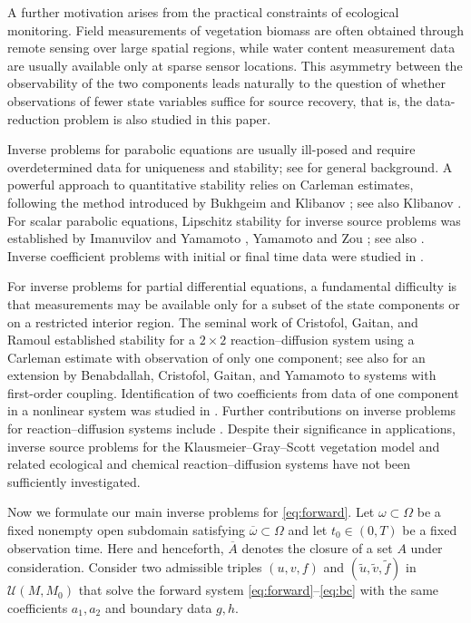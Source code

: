 \documentclass[12pt]{amsart}
\theoremstyle{plain}
\theoremstyle{definition}
\theoremstyle{remark}
\newcommand{\ooo}{\overline}
\newcommand{\Om}{\Omega}
\newcommand{\revi}[1]{{\color{blue}#1}}
\begin{document}
A further motivation arises from the practical constraints of ecological
monitoring.
Field measurements of vegetation biomass are often obtained through remote
sensing over large spatial regions, while water content measurement data 
are usually available only at sparse sensor locations.
This asymmetry between the observability of the two components leads naturally
to the question of whether observations of fewer state variables
suffice for source recovery, that is, the data-reduction problem is also 
studied in this paper.

Inverse problems for parabolic equations are usually ill-posed and require
overdetermined data for uniqueness and stability; see
\cite{isakov1998inverse,Y25} for general background.
A powerful approach to quantitative stability relies on Carleman estimates, following the method introduced by Bukhgeim and Klibanov \cite{bukhgeim1981global}; see also
Klibanov \cite{klibanov1992inverse}.
For scalar parabolic equations, Lipschitz stability for inverse source problems
was established by Imanuvilov and Yamamoto \cite{imanuvilov1998lipschitz}, 
Yamamoto and Zou \cite{YZ}; see also \cite{huang2020stability, yamamoto2009carleman}.
Inverse coefficient problems with initial or final time data were studied in
\cite{ImanuvilovYamamoto2024}.

For inverse problems for partial differential equations, 
a fundamental difficulty is that measurements may be available only for a 
subset of the state components or on a restricted interior region.
The seminal work of Cristofol, Gaitan, and Ramoul
\cite{cristofol2006inverse} established stability for a $2\times 2$ 
reaction--diffusion system using a Carleman estimate with observation of only one component; see also \cite{benabdallah2009inverse} for an extension by
Benabdallah, Cristofol, Gaitan, and Yamamoto to systems with first-order coupling.
Identification of two coefficients from data of one component in a nonlinear system was studied in \cite{cristofol2012identification}.
Further contributions on inverse problems for reaction--diffusion systems 
include \cite{boulakia2021numerical, kaltenbacher2020inverse, pyatkov2017some}.
Despite their significance in applications, inverse source problems for the Klausmeier--Gray--Scott vegetation model and related ecological and chemical reaction--diffusion systems have not been sufficiently investigated.

Now we formulate our main inverse problems for \revi{\eqref{eq:forward}}.
Let $\omega \subset\Om$ be a fixed nonempty open subdomain satisfying $\ooo{\omega} \subset \Om$ and let $t_0\in(0,T)$ be a fixed observation time. 
Here and henceforth, $\ooo{A}$ denotes the closure of a set $A$ under 
consideration.
Consider two admissible triples $(u,v,f)$ and $(\tilde u,\tilde v,\tilde f)$ in $\mathcal{U}(M,M_0)$ that solve the forward system \eqref{eq:forward}--\eqref{eq:bc} with the same coefficients $a_1, a_2$ and
boundary data $g, h$.
\end{document}

